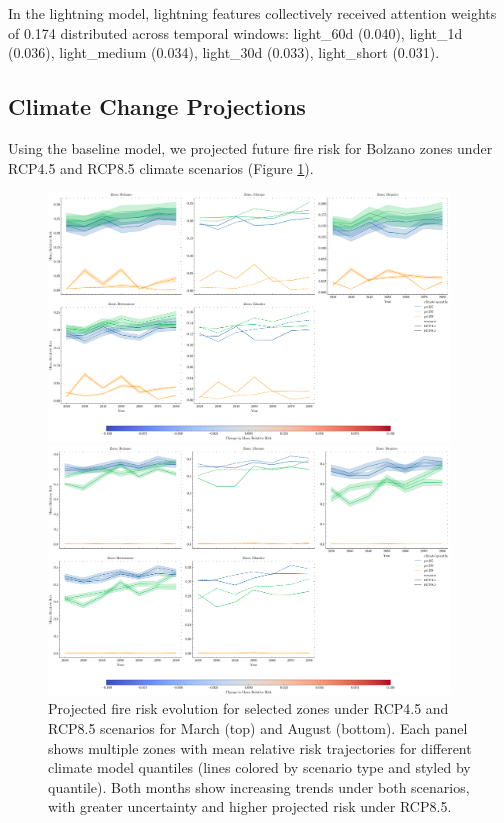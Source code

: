 \documentclass[11pt,a4paper]{article}
\begin{document}
In the lightning model, lightning features collectively received attention weights of 0.174 distributed across temporal windows: light\_60d (0.040), light\_1d (0.036), light\_medium (0.034), light\_30d (0.033), light\_short (0.031).

\subsection{Climate Change Projections}

Using the baseline model, we projected future fire risk for Bolzano zones under RCP4.5 and RCP8.5 climate scenarios (Figure \ref{fig:climate_projections}).

\begin{figure}[H]
\centering
\includegraphics[width=0.95\textwidth]{../output/figures/climate_projection_plot_march.png}

\vspace{0.5cm}

\includegraphics[width=0.95\textwidth]{../output/figures/climate_projection_plot_august.png}
\caption{Projected fire risk evolution for selected zones under RCP4.5 and RCP8.5 scenarios for March (top) and August (bottom). Each panel shows multiple zones with mean relative risk trajectories for different climate model quantiles (lines colored by scenario type and styled by quantile). Both months show increasing trends under both scenarios, with greater uncertainty and higher projected risk under RCP8.5.}
\label{fig:climate_projections}
\end{figure}
\end{document}
